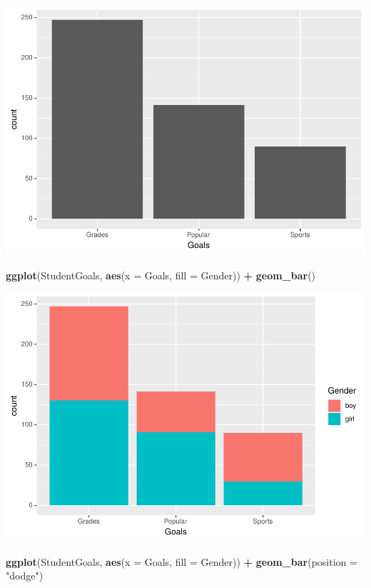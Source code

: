 \documentclass[
]{krantz}
\makeatletter
\newenvironment{Shaded}{\begin{snugshade}}{\end{snugshade}}
\newcommand{\DataTypeTok}[1]{\textcolor[rgb]{0.27,0.27,0.27}{#1}}
\newcommand{\KeywordTok}[1]{\textcolor[rgb]{0.27,0.27,0.27}{\textbf{#1}}}
\newcommand{\NormalTok}[1]{#1}
\newcommand{\OperatorTok}[1]{\textcolor[rgb]{0.43,0.43,0.43}{\textbf{#1}}}
\newcommand{\StringTok}[1]{\textcolor[rgb]{0.5,0.5,0.5}{#1}}
\newenvironment{kframe}{%
\medskip{}
\setlength{\fboxsep}{.8em}
 \def\at@end@of@kframe{}%
 \ifinner\ifhmode%
  \def\at@end@of@kframe{\end{minipage}}%
  \begin{minipage}{\columnwidth}%
 \fi\fi%
 \def\FrameCommand##1{\hskip\@totalleftmargin \hskip-\fboxsep
 \colorbox{shadecolor}{##1}\hskip-\fboxsep
     \hskip-\linewidth \hskip-\@totalleftmargin \hskip\columnwidth}%
 \MakeFramed {\advance\hsize-\width
   \@totalleftmargin\z@ \linewidth\hsize
   \@setminipage}}%
 {\par\unskip\endMakeFramed%
 \at@end@of@kframe}
\renewenvironment{Shaded}{\begin{kframe}}{\end{kframe}}
\makeatother
\begin{document}
\includegraphics{bookdown_files/figure-latex/unnamed-chunk-80-1.pdf}

\begin{Shaded}
\begin{Highlighting}[]
\KeywordTok{ggplot}\NormalTok{(StudentGoals, }\KeywordTok{aes}\NormalTok{(}\DataTypeTok{x =}\NormalTok{ Goals, }\DataTypeTok{fill =}\NormalTok{ Gender)) }\OperatorTok{+}\StringTok{ }\KeywordTok{geom\_bar}\NormalTok{()}
\end{Highlighting}
\end{Shaded}

\includegraphics{bookdown_files/figure-latex/unnamed-chunk-80-2.pdf}

\begin{Shaded}
\begin{Highlighting}[]
\KeywordTok{ggplot}\NormalTok{(StudentGoals, }\KeywordTok{aes}\NormalTok{(}\DataTypeTok{x =}\NormalTok{ Goals, }\DataTypeTok{fill =}\NormalTok{ Gender)) }\OperatorTok{+}\StringTok{ }
\StringTok{    }\KeywordTok{geom\_bar}\NormalTok{(}\DataTypeTok{position =} \StringTok{"dodge"}\NormalTok{)}
\end{Highlighting}
\end{Shaded}
\end{document}
